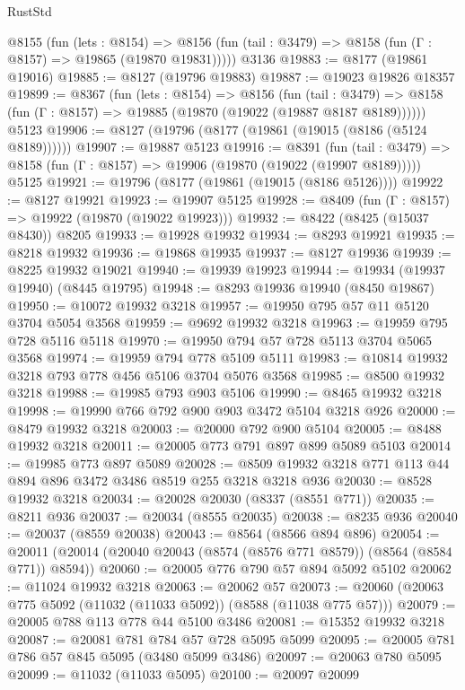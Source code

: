 \begin{lexlean}{RustStd}
\begin{coremodule}
    @8155
      (fun (lets : @8154) =>
      @8156 (fun (tail : @3479) => @8158 (fun (Γ : @8157) => @19865 (@19870 @19831)))))
    @3136
@19883 := @8177 (@19861 @19016)
@19885 := @8127 (@19796 @19883)
@19887 := @19023 @19826 @18357
@19899 := @8367
    (fun (lets : @8154) =>
    @8156
      (fun (tail : @3479) =>
      @8158 (fun (Γ : @8157) => @19885 (@19870 (@19022 (@19887 @8187 @8189))))))
    @5123
@19906 := @8127 (@19796 (@8177 (@19861 (@19015 (@8186 (@5124 @8189))))))
@19907 := @19887 @5123
@19916 := @8391
    (fun (tail : @3479) => @8158 (fun (Γ : @8157) => @19906 (@19870 (@19022 (@19907 @8189)))))
    @5125
@19921 := @19796 (@8177 (@19861 (@19015 (@8186 @5126))))
@19922 := @8127 @19921
@19923 := @19907 @5125
@19928 := @8409 (fun (Γ : @8157) => @19922 (@19870 (@19022 @19923)))
@19932 := @8422 (@8425 (@15037 @8430)) @8205
@19933 := @19928 @19932
@19934 := @8293 @19921
@19935 := @8218 @19932
@19936 := @19868 @19935
@19937 := @8127 @19936
@19939 := @8225 @19932 @19021
@19940 := @19939 @19923
@19944 := @19934 (@19937 @19940) (@8445 @19795)
@19948 := @8293 @19936 @19940 (@8450 @19867)
@19950 := @10072 @19932 @3218
@19957 := @19950 @795 @57 @11 @5120 @3704 @5054 @3568
@19959 := @9692 @19932 @3218
@19963 := @19959 @795 @728 @5116 @5118
@19970 := @19950 @794 @57 @728 @5113 @3704 @5065 @3568
@19974 := @19959 @794 @778 @5109 @5111
@19983 := @10814 @19932 @3218 @793 @778 @456 @5106 @3704 @5076 @3568
@19985 := @8500 @19932 @3218
@19988 := @19985 @793 @903 @5106
@19990 := @8465 @19932 @3218
@19998 := @19990 @766 @792 @900 @903 @3472 @5104 @3218 @926
@20000 := @8479 @19932 @3218
@20003 := @20000 @792 @900 @5104
@20005 := @8488 @19932 @3218
@20011 := @20005 @773 @791 @897 @899 @5089 @5103
@20014 := @19985 @773 @897 @5089
@20028 := @8509 @19932 @3218 @771 @113 @44 @894 @896 @3472 @3486 @8519 @255 @3218 @3218 @936
@20030 := @8528 @19932 @3218
@20034 := @20028 @20030 (@8337 (@8551 @771))
@20035 := @8211 @936
@20037 := @20034 (@8555 @20035)
@20038 := @8235 @936
@20040 := @20037 (@8559 @20038)
@20043 := @8564 (@8566 @894 @896)
@20054 := @20011 (@20014 (@20040 @20043 (@8574 (@8576 @771 @8579)) (@8564 (@8584 @771)) @8594))
@20060 := @20005 @776 @790 @57 @894 @5092 @5102
@20062 := @11024 @19932 @3218
@20063 := @20062 @57
@20073 := @20060 (@20063 @775 @5092 (@11032 (@11033 @5092)) (@8588 (@11038 @775 @57)))
@20079 := @20005 @788 @113 @778 @44 @5100 @3486
@20081 := @15352 @19932 @3218
@20087 := @20081 @781 @784 @57 @728 @5095 @5099
@20095 := @20005 @781 @786 @57 @845 @5095 (@3480 @5099 @3486)
@20097 := @20063 @780 @5095
@20099 := @11032 (@11033 @5095)
@20100 := @20097 @20099

\end{coremodule}
\end{lexlean}

